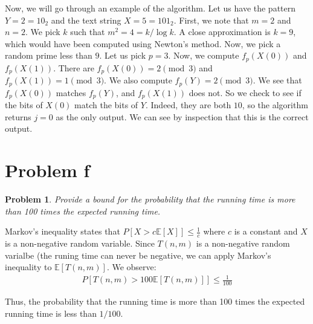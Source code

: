 \documentclass[psamsfonts]{amsart}
\newtheorem{prob}{Problem}[section]
\newenvironment{sol}{{\bfseries Solution}}{\qedsymbol}
\theoremstyle{definition}
\theoremstyle{remark}
\numberwithin{equation}{section}
\begin{document}
\begin{sol}
Now, we will go through an example of the algorithm. Let us have the pattern $Y=2 = 10_{2}$ and the text string $X = 5 = 101_{2}$. First, we note that $m = 2$ and $n=2$. We pick $k$ such that $m^2 = 4 = k / \log k$. A close approximation is $k = 9$, which would have been computed using Newton's method. Now, we pick a random prime less than $9$. Let us pick $p = 3$. Now, we compute $f_p(X(0))$ and $f_p(X(1))$. There are $f_p(X(0)) = 2 \pmod{3}$ and $f_p(X(1)) = 1 \pmod{3}$. We also compute $f_p(Y) = 2 \pmod{3}$. We see that $f_p(X(0))$ matches $f_p(Y)$, and $f_p(X(1))$ does not. So we check to see if the bits of $X(0)$ match the bits of $Y$. Indeed, they are both $10$, so the algorithm returns $j = 0$ as the only output. We can see by inspection that this is the correct output.  
\end{sol}

\section{Problem f}

\begin{prob}
Provide a bound for the probability that the running time is more than 100 times the expected running time.
\end{prob}

\begin{sol}
Markov's inequality states that $P[X > c \mathbb{E}[X] ] \leq \frac{1}{c}$ where $c$ is a constant and $X$ is a non-negative random variable. Since $T(n,m)$ is a non-negative random varialbe (the runing time can never be negative, we can apply Markov's inequality to $\mathbb{E}[T(n,m)]$. We observe:
\begin{eqnarray}
P\left[T(n,m) > 100 \mathbb{E}[T(n,m)] \right] \leq \frac{1}{100}
\end{eqnarray}

Thus, the probability that the running time is more than 100 times the expected running time is less than $1/100$.
\end{sol}
\end{document}
